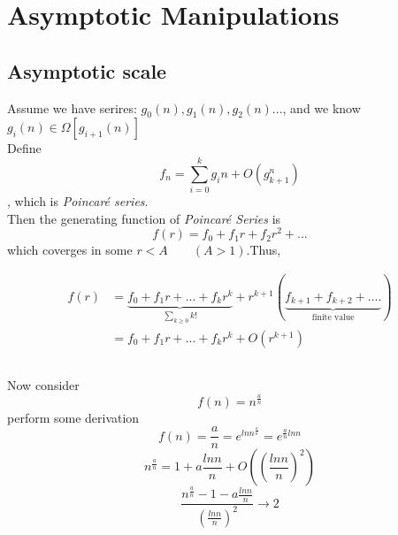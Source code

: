 \documentclass[11pt]{article}
\begin{document}
\section{Asymptotic Manipulations}

\subsection{Asymptotic scale}

Assume we have serires: $g_0(n), g_1(n), g_2(n) ...$, and we know $g_i(n) \in \Omega [g_{i+1}(n)]$ 
\\
Define \\
\[f_n = \sum_{i=0}^k g_i{n} + O(g_{k+1}^n)\]
, which is \textit{Poincaré series}. \\
Then the generating function of \emph{Poincar\'e Series} is \\
\[f(r)=f_0+f_1r+f_2r^2+...\]
 which coverges in some $ r<A\qquad (A>1)$.Thus,

\begin{align*}
f(r)  &= \underbrace{f_0 + f_1r + ... +f_kr^k }_{\sum_{k\geq0} k!}+ r^{k+1}(\underbrace{f_{k+1}+ f_{k+2} + ....}_{\mbox{finite value}}) \\
      &= f_0 + f_1r + ... + f_kr^k + O(r^{k+1})
\end{align*}

\subsection{}
Now consider \\
\[ f(n) = n^{\frac{a}{n}} \]
perform some derivation \\
\[
f(n)=\frac{a}{n}=e^{lnn^{\frac{a}{n}}}=e^{\frac{a}{n}lnn}
\]
\[
n^{\frac{a}{n}}=1+a\frac{lnn}{n}+O\left((\frac{lnn}{n})^2\right)
\]
\[
\frac{n^{\frac{a}{n}}-1-a\frac{lnn}{n}}{(\frac{lnn}{n})^2}\rightarrow 2
\]
\end{document}
